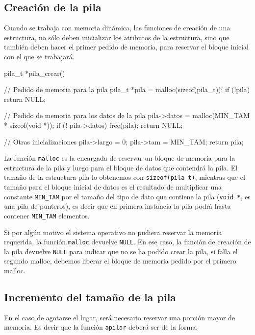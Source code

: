 \subsection{Creación de la pila}

Cuando se trabaja con memoria dinámica, las funciones de creación de una
estructura, no sólo deben inicializar los atributos de la estructura, sino que
también deben hacer el primer pedido de memoria, para reservar el bloque
inicial con el que se trabajará.

\begin{codigo-c-plano}
pila_t *pila_crear()
{
    // Pedido de memoria para la pila
    pila_t *pila = malloc(sizeof(pila_t));
    if (!pila) return NULL;

    // Pedido de memoria para los datos de la pila
    pila->datos = malloc(MIN_TAM * sizeof(void *));
    if (! pila->datos) {
        free(pila);
        return NULL;
    }

    // Otras inicializaciones
    pila->largo = 0;
    pila->tam = MIN_TAM;
    return pila;
}
\end{codigo-c-plano}

La función \lstinline!malloc! es la encargada de reservar un bloque de memoria
para la estructura de la pila y luego para el bloque de datos que contendrá la
pila. El tamaño de la estructura pila lo obtenemos con
\lstinline!sizeof(pila_t)!, mientras que el tamaño para el bloque inicial de
datos es el resultado de multiplicar una constante \lstinline!MIN_TAM! por el tamaño del tipo de
dato que contiene la pila (\lstinline!void *!, es una pila de
punteros), es decir que en primera instancia la pila podrá
hasta contener \lstinline!MIN_TAM! elementos.

Si por algún motivo el sistema operativo no pudiera reservar la memoria
requerida, la función \lstinline!malloc! devuelve \lstinline!NULL!. En ese
caso, la función de creación de la pila devuelve \lstinline!NULL! para
indicar que no se ha podido crear la pila, si falla el segundo malloc, debemos
liberar el bloque de memoria pedido por el primero malloc.

\subsection{Incremento del tamaño de la pila}

En el caso de agotarse el lugar, será necesario reservar una porción mayor de
memoria.  Es decir que la función \lstinline!apilar! deberá ser de la forma:

